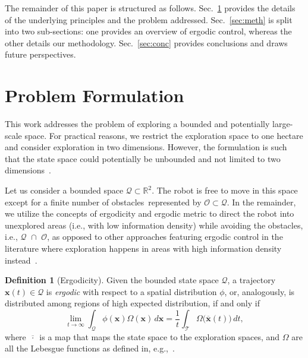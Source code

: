 \documentclass[letterpaper,10pt,conference,twoside]{IEEEtran}
\theoremstyle{definition}
\newtheorem{defn}{Definition}[section]
\begin{document}
The remainder of this paper is structured as follows. Sec.~\ref{sec:pb} provides the details of the underlying principles and the problem addressed. Sec.~\ref{sec:meth} is split into two sub-sections: one provides an overview of ergodic control, whereas the other details our methodology. Sec.~\ref{sec:conc} provides conclusions and draws future perspectives.


\section{Problem Formulation}\label{sec:pb}
\noindent
This work addresses the problem of exploring a bounded and potentially large-scale space. For practical reasons, we restrict the exploration space to one hectare and consider exploration in two dimensions. However, the formulation is such that the state space could potentially be unbounded and not limited to two dimensions~\cite{dong2023time}.

Let us consider a bounded space $\mathcal{Q}\subset\mathbb{R}^2$. The robot is free to move in this space except for a finite number of obstacles~represented by $\mathcal{O}\subset\mathcal{Q}$. In the remainder, we utilize the concepts of ergodicity and ergodic metric to direct the robot into unexplored areas (i.e., with low information density) while avoiding the obstacles, i.e., $\mathcal{Q}\,\,\cap\,\,\mathcal{O}$, as opposed to other approaches featuring ergodic control in the literature where exploration happens in areas with high information density instead~\cite{mathew2011metrics,abraham2017ergodic,miller2013trajectory}.

\begin{defn}[Ergodicity]
  Given the bounded state space $\mathcal{Q}$, a trajectory $\mathbf{x}(t)\in\mathcal{Q}$ is \textit{ergodic} with respect to a spatial distribution $\phi$, or, analogously, is distributed among regions of high expected distribution, if and only if
  \begin{equation}
    \lim_{t\rightarrow\infty}{\int_{\mathcal{Q}}\phi(\mathbf{x})\Omega(\mathbf{x})\,d\mathbf{x}=\frac{1}{t}\int_{\mathcal{T}}{{\Omega\big(\overline{\mathbf{x}}(t)\big)}}\,dt},
  \end{equation}
  where $\overline{\,\cdot\,}$ is a map that maps the state space to the exploration spaces, and $\Omega$ are all the Lebesgue functions as defined in, e.g.,~\cite{mathew2011metrics}.
\end{defn}
\end{document}
